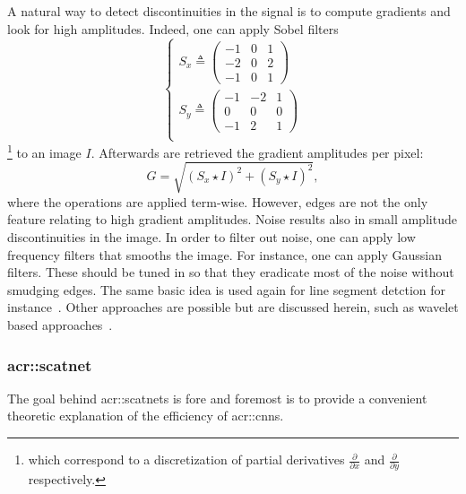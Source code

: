             A natural way to detect discontinuities in the signal is to compute gradients and look for high amplitudes.
            Indeed, one can apply Sobel filters
            \begin{equation}
                \label{eq::sobel_filters}
                \begin{cases}
                    S_x \triangleq \begin{pmatrix}
                        -1 & 0 & 1\\
                        -2 & 0 & 2\\
                        -1 & 0 & 1
                    \end{pmatrix}\\
                    S_y \triangleq \begin{pmatrix}
                        -1 & -2 & 1\\
                        0 & 0 & 0\\
                        -1 & 2 & 1
                    \end{pmatrix}\\
                \end{cases}
            \end{equation}
            \footnote{which correspond to a discretization of partial derivatives $\frac{\partial}{\partial x}$ and $\frac{\partial}{\partial y}$ respectively.} to an image $I$.
            Afterwards are retrieved the gradient amplitudes per pixel:
            \begin{equation}
                \label{eq::sobel_amplitude}
                G = \sqrt{\left(S_x\star I\right)^2 + \left(S_y\star I\right)^2},
            \end{equation}
            where the operations are applied term-wise.
            However, edges are not the only feature relating to high gradient amplitudes.
            Noise results also in small amplitude discontinuities in the image.
            In order to filter out noise, one can apply low frequency filters that smooths the image.
            For instance, one can apply Gaussian filters.
            These should be tuned in so that they eradicate most of the noise without smudging edges.
            The same basic idea is used again for line segment detction for instance~\parencite{von2008lsd}.
            Other approaches are possible but are discussed herein, such as wavelet based approaches~\parencite{mallat1992singularity}.

        \subsubsection{\acrlong*{acr::scatnet}}
            The goal behind \glspl{acr::scatnet} is fore and foremost is to provide a convenient theoretic explanation of the efficiency of \glspl{acr::cnn}.
            
